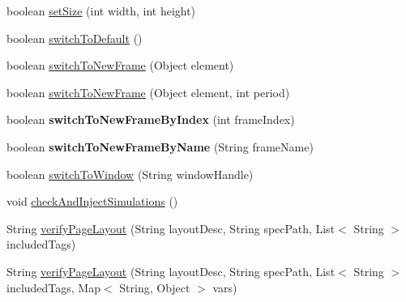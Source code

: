 \begin{DoxyCompactItemize}
boolean \hyperlink{classcom_1_1zeuslearning_1_1automation_1_1selenium_1_1interactions_1_1BrowserWindow_a471ae0f451cf2fb3a931478d114923c2}{set\+Size} (int width, int height)
\item 
boolean \hyperlink{classcom_1_1zeuslearning_1_1automation_1_1selenium_1_1interactions_1_1BrowserWindow_a4579549812a37d3984bda3e5facb2a2d}{switch\+To\+Default} ()
\item 
boolean \hyperlink{classcom_1_1zeuslearning_1_1automation_1_1selenium_1_1interactions_1_1BrowserWindow_ae6c8f6ecf277ac9da4d262eff3147403}{switch\+To\+New\+Frame} (Object element)
\item 
boolean \hyperlink{classcom_1_1zeuslearning_1_1automation_1_1selenium_1_1interactions_1_1BrowserWindow_ad9874267c9a73f226dc6a7863ae184a2}{switch\+To\+New\+Frame} (Object element, int period)
\item 
\hypertarget{classcom_1_1zeuslearning_1_1automation_1_1selenium_1_1interactions_1_1BrowserWindow_aa4002a0abc2a3b4179c036240acf7e48}{}\label{classcom_1_1zeuslearning_1_1automation_1_1selenium_1_1interactions_1_1BrowserWindow_aa4002a0abc2a3b4179c036240acf7e48} 
boolean {\bfseries switch\+To\+New\+Frame\+By\+Index} (int frame\+Index)
\item 
\hypertarget{classcom_1_1zeuslearning_1_1automation_1_1selenium_1_1interactions_1_1BrowserWindow_af3ce4435319de5e445f79e2e71571b3e}{}\label{classcom_1_1zeuslearning_1_1automation_1_1selenium_1_1interactions_1_1BrowserWindow_af3ce4435319de5e445f79e2e71571b3e} 
boolean {\bfseries switch\+To\+New\+Frame\+By\+Name} (String frame\+Name)
\item 
boolean \hyperlink{classcom_1_1zeuslearning_1_1automation_1_1selenium_1_1interactions_1_1BrowserWindow_aed6af64be64fb3d9db28ace2a33f2017}{switch\+To\+Window} (String window\+Handle)
\item 
void \hyperlink{classcom_1_1zeuslearning_1_1automation_1_1selenium_1_1interactions_1_1BrowserWindow_a501c3085d022ec5cd5ced4631c46eaae}{check\+And\+Inject\+Simulations} ()
\item 
String \hyperlink{classcom_1_1zeuslearning_1_1automation_1_1selenium_1_1interactions_1_1BrowserWindow_a7fdf7cc7035b78a95a35e3f7b6989430}{verify\+Page\+Layout} (String layout\+Desc, String spec\+Path, List$<$ String $>$ included\+Tags)
\item 
String \hyperlink{classcom_1_1zeuslearning_1_1automation_1_1selenium_1_1interactions_1_1BrowserWindow_a3ea69b7cde363086381c0f8b4e2df474}{verify\+Page\+Layout} (String layout\+Desc, String spec\+Path, List$<$ String $>$ included\+Tags, Map$<$ String, Object $>$ vars)

\end{DoxyCompactItemize}
